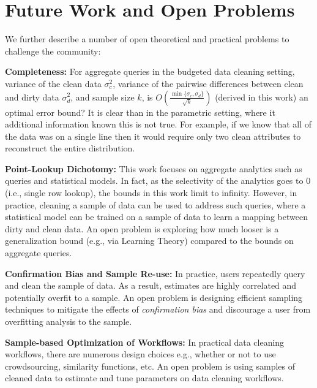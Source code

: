 \section{Future Work and Open Problems}


We further describe a number of open theoretical and practical problems to challenge the community:

\vspace{0.5em}
\noindent \textbf{Completeness: } For aggregate queries in the budgeted data cleaning setting,
variance of the clean data $\sigma_c^2$, variance of the pairwise differences between clean and dirty data $\sigma_d^2$, and sample size $k$, is $O(\frac{\min \{\sigma_c,\sigma_d\}}{\sqrt{k}})$ (derived in this work) an optimal error bound? 
It is clear than in the parametric setting, where it additional information known this is not true.  For example, if we know that all of the data was on a single line then it would require only two clean attributes to reconstruct the entire distribution. 

\vspace{0.5em}
\noindent \textbf{Point-Lookup Dichotomy: } This work focuses on aggregate analytics such as queries and statistical models. In fact, as the selectivity of the analytics goes to 0 (i.e., single row lookup), the bounds in this work limit to infinity. However, in practice, cleaning a sample of data can be used to address such queries, where a statistical model can be trained on a sample of data to learn a mapping between dirty and clean data. An open problem is exploring how much looser is a generalization bound (e.g., via Learning Theory) compared to the bounds on aggregate queries.

\vspace{0.5em}
\noindent \textbf{Confirmation Bias and Sample Re-use: }  In practice, users repeatedly query and clean the sample of data. As a result, estimates are highly correlated and potentially overfit to a sample. An open problem is designing efficient sampling techniques to mitigate the effects of \emph{confirmation bias} and discourage a user from overfitting analysis to the sample.

\vspace{0.5em}
\noindent \textbf{Sample-based Optimization of Workflows: } In practical data cleaning workflows, there are numerous design choices e.g., whether or not to use crowdsourcing, similarity functions, etc. An open problem is using samples of cleaned data to estimate and tune parameters on data cleaning workflows. 


